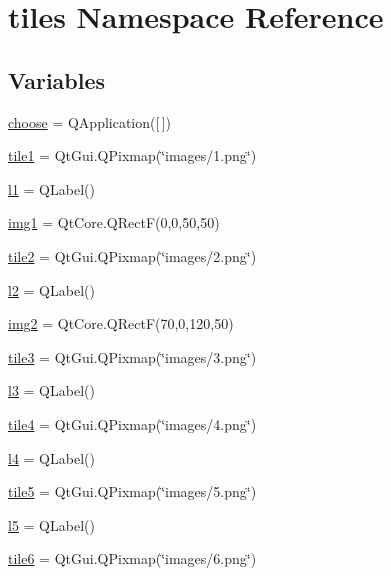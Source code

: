 \hypertarget{namespacetiles}{}\section{tiles Namespace Reference}
\label{namespacetiles}
\subsection*{Variables}
\begin{DoxyCompactItemize}
\item 
\mbox{\hyperlink{namespacetiles_abfbd77603b58941b397097350cd4b2ad}{choose}} = Q\+Application(\mbox{[}$\,$\mbox{]})
\item 
\mbox{\hyperlink{namespacetiles_a6cdc4269e5f00586b2ae64520ebc4ca7}{tile1}} = Qt\+Gui.\+Q\+Pixmap(\char`\"{}images/1.png\char`\"{})
\item 
\mbox{\hyperlink{namespacetiles_afb4c3a11c5754ea1031dc68c0f7c8f6a}{l1}} = Q\+Label()
\item 
\mbox{\hyperlink{namespacetiles_a4ef5bc0ece7b55258e0118f28d8d06b9}{img1}} = Qt\+Core.\+Q\+RectF(0,0,50,50)
\item 
\mbox{\hyperlink{namespacetiles_a7976b31b4d032a09e47054a6c1a1b11d}{tile2}} = Qt\+Gui.\+Q\+Pixmap(\char`\"{}images/2.png\char`\"{})
\item 
\mbox{\hyperlink{namespacetiles_a684c78d24b79d056e12a9b5c8aa86ecd}{l2}} = Q\+Label()
\item 
\mbox{\hyperlink{namespacetiles_a7e395173f3d75429315d4088c004d05f}{img2}} = Qt\+Core.\+Q\+RectF(70,0,120,50)
\item 
\mbox{\hyperlink{namespacetiles_a0fa6a8935e546e55741280d0030c08f0}{tile3}} = Qt\+Gui.\+Q\+Pixmap(\char`\"{}images/3.png\char`\"{})
\item 
\mbox{\hyperlink{namespacetiles_a254501b081f1a293af3dd217c9be3ffb}{l3}} = Q\+Label()
\item 
\mbox{\hyperlink{namespacetiles_a583600e0c2ef7fdf4804b2f7789a6505}{tile4}} = Qt\+Gui.\+Q\+Pixmap(\char`\"{}images/4.png\char`\"{})
\item 
\mbox{\hyperlink{namespacetiles_ad8a0fe4d4d12e46a051f04859d4b1cf5}{l4}} = Q\+Label()
\item 
\mbox{\hyperlink{namespacetiles_a84e293464dc8b4d59eefa6a172f376b9}{tile5}} = Qt\+Gui.\+Q\+Pixmap(\char`\"{}images/5.png\char`\"{})
\item 
\mbox{\hyperlink{namespacetiles_a246947d32c280cee85469a46d41f2979}{l5}} = Q\+Label()
\item 
\mbox{\hyperlink{namespacetiles_a858e46b259ee31fe6811a43bc1725fde}{tile6}} = Qt\+Gui.\+Q\+Pixmap(\char`\"{}images/6.png\char`\"{})

\end{DoxyCompactItemize}

